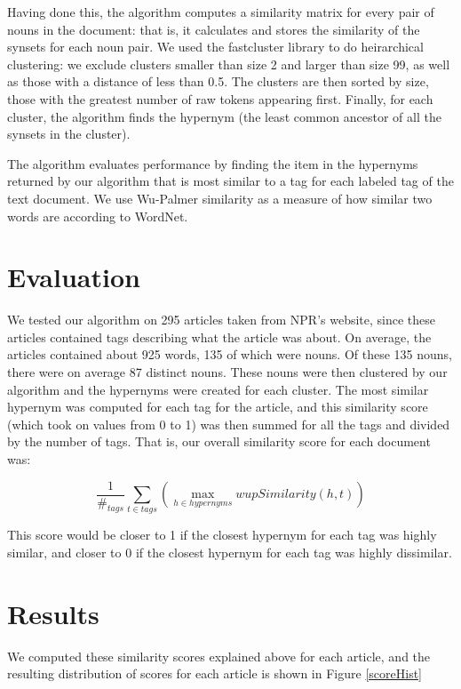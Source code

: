 \documentclass[11pt]{article}
\begin{document}
Having done this, the algorithm computes a similarity matrix for every pair of nouns in the document: that is, it calculates and stores the similarity of the synsets for each noun pair. We used the fastcluster library to do heirarchical clustering: we  exclude clusters smaller than size 2 and larger than size 99, as well as those with a distance of less than 0.5. The clusters are then sorted by size, those with the greatest number of raw tokens appearing first. Finally, for each cluster, the algorithm finds the hypernym (the least common ancestor of all the synsets in the cluster).

The algorithm evaluates performance by finding the item in the hypernyms returned by our algorithm that is most similar to a tag for each labeled tag of the text document. We use Wu-Palmer similarity as a measure of how similar two words are according to WordNet.

\section{Evaluation}

We tested our algorithm on 295 articles taken from NPR's website, since these articles contained tags describing what the article was about. On average, the articles contained about 925 words, 135 of which were nouns. Of these 135 nouns, there were on average 87 distinct nouns. These nouns were then clustered by our algorithm and the hypernyms were created for each cluster. The most similar hypernym was computed for each tag for the article, and this similarity score (which took on values from 0 to 1) was then summed for all the tags and divided by the number of tags. That is, our overall similarity score for each document was:

\[
 \frac{1}{\#_{tags}} \sum_{t \in tags}{(\max_{h \in hypernyms}{wupSimilarity(h, t)})}
\]

This score would be closer to 1 if the closest hypernym for each tag was highly similar, and closer to 0 if the closest hypernym for each tag was highly dissimilar.

\section{Results}

We computed these similarity scores explained above for each article, and the resulting distribution of scores for each article is shown in Figure \ref{scoreHist}
\end{document}
